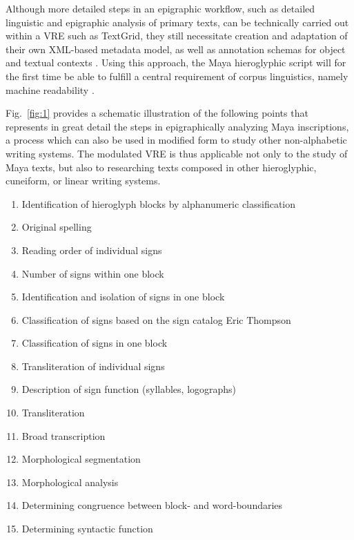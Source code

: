\documentclass[amsthm,ebook]{saparticle}
\begin{document}
Although more detailed steps in an epigraphic workflow, such as detailed linguistic and epigraphic analysis of primary
texts, can be technically carried out within a VRE such as TextGrid, they still necessitate creation and adaptation of
their own XML-based metadata model, as well as annotation schemas for object and textual contexts \citep{Prager2015}. Using
this approach, the Maya hieroglyphic script will for the first time be able to fulfill a central requirement of corpus
linguistics, namely machine readability \citep{McEneryWilson2001}. 

Fig.~\ref{fig:1} provides a schematic illustration of the following points that represents in great detail the steps in
epigraphically analyzing Maya inscriptions, a process which can also be used in modified form to study other
non-alphabetic writing systems. The modulated VRE is thus applicable not only to the study of Maya texts, but also to
researching texts composed in other hieroglyphic, cuneiform, or linear writing systems. 




\begin{enumerate}
\item Identification of hieroglyph blocks by alphanumeric classification 
\item Original spelling
\item Reading order of individual signs 
\item Number of signs within one block 
\item Identification and isolation of signs in one block 
\item Classification of signs based on the sign catalog Eric Thompson
\item Classification of signs in one block 
\item Transliteration of individual signs 
\item Description of sign function (syllables, logographs)
\item Transliteration 
\item Broad transcription
\item Morphological segmentation 
\item Morphological analysis 
\item Determining congruence between block- and word-boundaries 
\item Determining syntactic function 

\end{enumerate}
\end{document}
